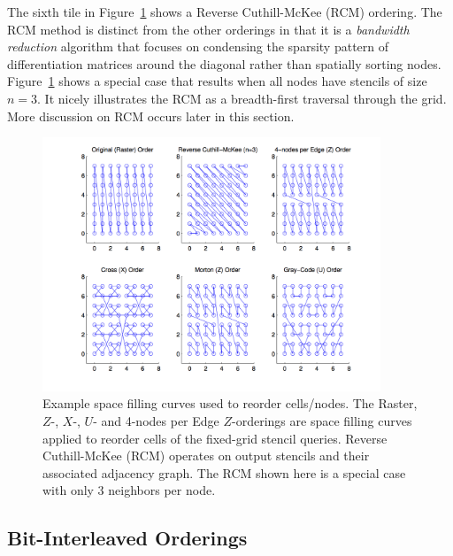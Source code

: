 \documentclass{report}
\begin{document}
The sixth tile in Figure~\ref{fig:orderings} shows a Reverse Cuthill-McKee (RCM) ordering. The RCM method is distinct from the other orderings in that it is a \emph{bandwidth reduction} algorithm that focuses on condensing the sparsity pattern of differentiation matrices around the diagonal rather than spatially sorting nodes. Figure~\ref{fig:orderings} shows a special case that results when all nodes have stencils of size $n=3$. It nicely illustrates the RCM as a breadth-first traversal through the grid. More discussion on RCM occurs later in this section. 
\begin{figure}
\centering
\includegraphics[width=0.9\textwidth]{rbffd_methods_content/hashing/node_orderings.png} 
\caption{Example space filling curves used to reorder cells/nodes. The Raster, $Z$-, $X$-, $U$- and 4-nodes per Edge $Z$-orderings are space filling curves applied to reorder cells of the fixed-grid stencil queries. Reverse Cuthill-McKee (RCM) operates on output stencils and their associated adjacency graph. The RCM shown here is a special case with only 3 neighbors per node.}
\label{fig:orderings}
\end{figure}




\subsection{Bit-Interleaved Orderings}
\end{document}
